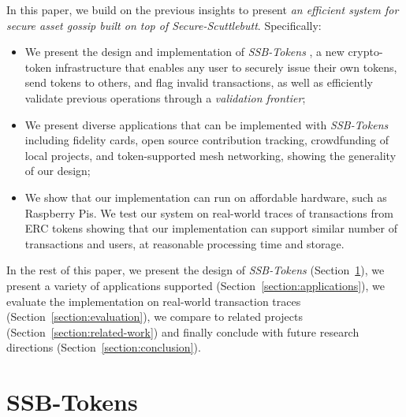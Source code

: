 \documentclass[sigplan,screen,10pt]{acmart}
\newcommand\ssbtokens[0]{\textit{SSB-Tokens} }
\begin{document}

In this paper, we build on the previous insights to present \textit{an efficient system for secure asset gossip built on top of Secure-Scuttlebutt}. Specifically:
\begin{itemize}
 \item We present the design and implementation of \ssbtokens, a new crypto-token infrastructure that enables any user to securely issue their own tokens, send tokens to others, and flag invalid transactions, as well as efficiently validate previous operations through a \textit{validation frontier};
 \item  We present diverse applications that can be implemented with \ssbtokens including fidelity cards, open source contribution tracking, crowdfunding of local projects, and token-supported mesh networking, showing the generality of our design;
 \item We show that our implementation can run on affordable hardware, such as Raspberry Pis. We test our system on real-world traces of transactions from ERC tokens showing that our implementation can support similar number of transactions and users, at reasonable processing time and storage.
\end{itemize}

In the rest of this paper,  we present the design of \ssbtokens (Section~\ref{section:design}), we present a variety of applications supported (Section~\ref{section:applications}), we evaluate the implementation on real-world transaction traces (Section~\ref{section:evaluation}), we compare to related projects (Section~\ref{section:related-work}) and finally conclude with future research directions (Section~\ref{section:conclusion}).




\section{SSB-Tokens}
\label{section:design}
\end{document}
